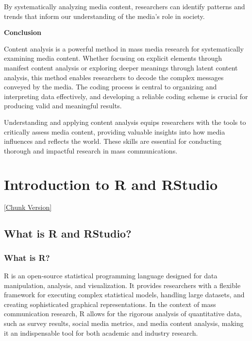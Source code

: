 \documentclass[
]{book}
\begin{document}
By systematically analyzing media content, researchers can identify patterns and trends that inform our understanding of the media's role in society.

\textbf{Conclusion}

Content analysis is a powerful method in mass media research for systematically examining media content. Whether focusing on explicit elements through manifest content analysis or exploring deeper meanings through latent content analysis, this method enables researchers to decode the complex messages conveyed by the media. The coding process is central to organizing and interpreting data effectively, and developing a reliable coding scheme is crucial for producing valid and meaningful results.

Understanding and applying content analysis equips researchers with the tools to critically assess media content, providing valuable insights into how media influences and reflects the world. These skills are essential for conducting thorough and impactful research in mass communications.

\chapter{Introduction to R and RStudio}\label{introduction-to-r-and-rstudio}

\href{_book/files/07-intro_R-chunks.Rmd}{{[}Chunk Version{]}}

\section{What is R and RStudio?}\label{what-is-r-and-rstudio}

\subsection*{What is R?}\label{what-is-r}

R is an open-source statistical programming language designed for data manipulation, analysis, and visualization. It provides researchers with a flexible framework for executing complex statistical models, handling large datasets, and creating sophisticated graphical representations. In the context of mass communication research, R allows for the rigorous analysis of quantitative data, such as survey results, social media metrics, and media content analysis, making it an indispensable tool for both academic and industry research.
\end{document}
